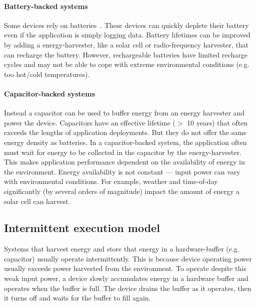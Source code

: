 \paragraph{Battery-backed systems}
Some devices rely on batteries~\cite{culler2002mica,jackson_2019,rowe2011sensor}.
% 
These devices can quickly deplete their battery even if the application is simply logging data.
% 
Battery lifetimes can be improved by adding a energy-harvester, like a solar cell or radio-frequency harvester, that can recharge the battery.
% 
However, rechargeable batteries have limited recharge cycles and may not be able to cope with extreme environmental conditions (e.g. too hot/cold temperatures).

\paragraph{Capacitor-backed systems}
Instead a capacitor can be used to buffer energy from an energy harvester and power the device.
% 
Capacitors have an effective lifetime ($>$ 10 years) that often exceeds the lengths of application deployments.
% 
But they do not offer the same energy density as batteries.
% 
In a capacitor-backed system, the application often must wait for energy to be collected in the capacitor by the energy-harvester.
% 
This makes application performance dependent on the availability of energy in the environment.
% 
Energy availability is not constant --- input power can vary with environmental conditions.
% 
For example, weather and time-of-day significantly (by several orders of magnitude) impact the amount of energy a solar cell can harvest.

\subsection{Intermittent execution model}
\label{chapter:background:intermittent}
Systems that harvest energy and store that energy in a hardware-buffer (e.g. capacitor) usually operate intermittently.
% 
This is because device operating power usually exceeds power harvested from the environment.
% 
To operate despite this weak input power, a device slowly accumulates energy in a hardware buffer and operates when the buffer is full. 
% 
The device drains the buffer as it operates, then it turns off and waits for the buffer to fill again.
% 

